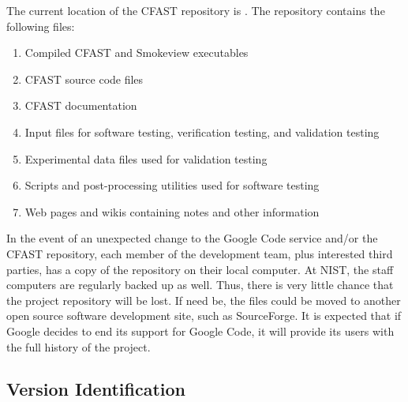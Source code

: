 The current location of the CFAST repository is \href{http://cfast.googlecode.com/svn/trunk/}{}. The repository contains the following files:
\begin{enumerate}
\item Compiled CFAST and Smokeview executables
\item CFAST source code files
\item CFAST documentation
\item Input files for software testing, verification testing, and validation testing
\item Experimental data files used for validation testing
\item Scripts and post-processing utilities used for software testing
\item Web pages and wikis containing notes and other information
\end{enumerate}
In the event of an unexpected change to the Google Code service and/or the CFAST repository, each member of the development team, plus interested third parties, has a copy of the repository on their local computer. At NIST, the staff computers are regularly backed up as well. Thus, there is very little chance that the project repository will be lost. If need be, the files could be moved to another open source software development site, such as SourceForge. It is expected that if Google decides to end its support for Google Code, it will provide its users with the full history of the project.

\subsection{Version Identification}

